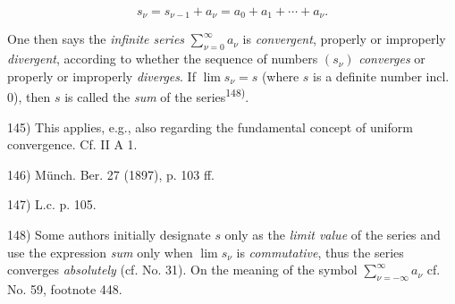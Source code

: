 \vspace{-0.5cm}
$$s_\nu = s_{\nu-1} + a_\nu = a_0 + a_1 + \cdots + a_\nu .$$

One then says the \textit{infinite series} $\sum_{\nu=0}^{\infty} a_\nu$ is \textit{convergent}, properly or improperly \textit{divergent}, according to whether the sequence of numbers $(s_\nu)$ \textit{converges} or properly or improperly \textit{diverges}. If $\lim s_\nu = s$ (where $s$ is a definite number incl. 0), then $s$ is called the \textit{sum} of the series\textsuperscript{148)}.

\vfill
\leftline{\rule{2in}{0.4pt}}
\vspace{0.2cm}
{
\footnotesize
145) This applies, e.g., also regarding the fundamental concept of uniform convergence. Cf. II A 1.

146) Münch. Ber. 27 (1897), p. 103 ff.

147) L.c. p. 105.

148) Some authors initially designate $s$ only as the \textit{limit value} of the series and use the expression \textit{sum} only when $\lim s_\nu$ is \textit{commutative}, thus the series converges \textit{absolutely} (cf. No. 31). On the meaning of the symbol $\sum_{\nu=-\infty}^{\infty} a_\nu$ cf. No. 59, footnote 448.

}
